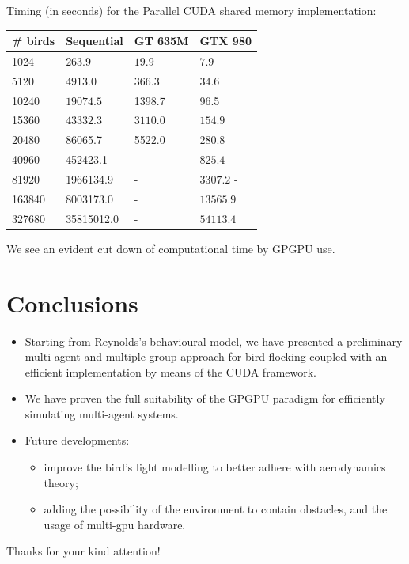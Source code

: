 \documentclass{beamer}
\begin{document}

\begin{frame}
Timing (in seconds) for the Parallel CUDA shared memory implementation:
\begin{table} [h!]
	\centering
	\begin{tabular}{|l |l |l| l|}
	\hline
	\# birds & Sequential & GT	635M & GTX 980
	\\
	\hline
	
	1024  & \(263.9\) & $19.9$ & $7.9$  \\
	5120  & \(4913.0\) & $366.3$ & $34.6$  \\
	10240 &  $19074.5$ & 1398.7 & 96.5  \\
	15360  & \(43332.3\) & $3110.0$ & $154.9$  \\
	20480  & 86065.7 & 5522.0 & $280.8$ \\
	40960  & 452423.1 & - & $825.4$ \\
	81920  & 1966134.9 & - & $3307.2$ - \\
	163840  & 8003173.0 & - & $13565.9$ \\
	327680  & 35815012.0 & - & $54113.4$  \\
	\hline
	\end{tabular}
	\label{tab:ifdiv}
\end{table}
We see an evident cut down of computational time by GPGPU use.
\end{frame}
\section{Conclusions}
\begin{frame}
\begin{itemize}
\item Starting from Reynolds's behavioural model, we have 
presented a preliminary multi-agent and multiple group approach for bird flocking coupled with an efficient implementation by means of the CUDA framework.
\item We have proven the full suitability of the GPGPU paradigm for efficiently simulating multi-agent systems.
\item Future developments:
\begin{itemize}
\item improve the bird's light modelling to better adhere with aerodynamics theory;
\item adding the possibility of the environment to contain obstacles, and the usage of multi-gpu hardware.
\end{itemize}
\end{itemize}
\end{frame}

\begin{frame}
\begin{center}
\begin{huge}Thanks for your kind attention! \end{huge}
\end{center}

\end{frame}
\end{document}
